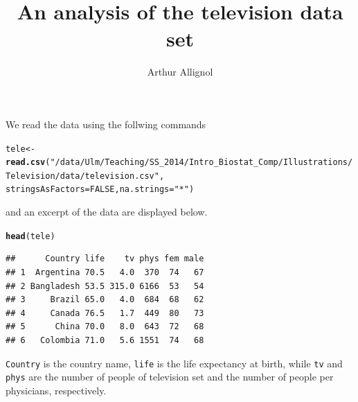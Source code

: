 \documentclass{article}\usepackage[]{graphicx}\usepackage[]{color}
\title{An analysis of the television data set}
\author{Arthur Allignol}
\date{}
\makeatletter
\newcommand{\hlnum}[1]{\textcolor[rgb]{0.686,0.059,0.569}{#1}}%
\newcommand{\hlstr}[1]{\textcolor[rgb]{0.192,0.494,0.8}{#1}}%
\newcommand{\hlstd}[1]{\textcolor[rgb]{0.345,0.345,0.345}{#1}}%
\newcommand{\hlkwb}[1]{\textcolor[rgb]{0.69,0.353,0.396}{#1}}%
\newcommand{\hlkwc}[1]{\textcolor[rgb]{0.333,0.667,0.333}{#1}}%
\newcommand{\hlkwd}[1]{\textcolor[rgb]{0.737,0.353,0.396}{\textbf{#1}}}%
\newenvironment{kframe}{%
 \def\at@end@of@kframe{}%
 \ifinner\ifhmode%
  \def\at@end@of@kframe{\end{minipage}}%
  \begin{minipage}{\columnwidth}%
 \fi\fi%
 \def\FrameCommand##1{\hskip\@totalleftmargin \hskip-\fboxsep
 \colorbox{shadecolor}{##1}\hskip-\fboxsep
     \hskip-\linewidth \hskip-\@totalleftmargin \hskip\columnwidth}%
 \MakeFramed {\advance\hsize-\width
   \@totalleftmargin\z@ \linewidth\hsize
   \@setminipage}}%
 {\par\unskip\endMakeFramed%
 \at@end@of@kframe}
\newenvironment{knitrout}{}{} %
\makeatother
\begin{document}
\maketitle



We read the data using the follwing commands
\begin{knitrout}\scriptsize
{}\color{fgcolor}\begin{kframe}
\begin{alltt}
\hlstd{tele} \hlkwb{<-} \hlkwd{read.csv}\hlstd{(}\hlstr{"/data/Ulm/Teaching/SS_2014/Intro_Biostat_Comp/Illustrations/Television/data/television.csv"}\hlstd{,}
                 \hlkwc{stringsAsFactors} \hlstd{=} \hlnum{FALSE}\hlstd{,} \hlkwc{na.strings} \hlstd{=} \hlstr{"*"}\hlstd{)}
\end{alltt}
\end{kframe}
\end{knitrout}
and an excerpt of the data are displayed below.
\begin{knitrout}\scriptsize
{}\color{fgcolor}\begin{kframe}
\begin{alltt}
\hlkwd{head}\hlstd{(tele)}
\end{alltt}
\begin{verbatim}
##      Country life    tv phys fem male
## 1  Argentina 70.5   4.0  370  74   67
## 2 Bangladesh 53.5 315.0 6166  53   54
## 3     Brazil 65.0   4.0  684  68   62
## 4     Canada 76.5   1.7  449  80   73
## 5      China 70.0   8.0  643  72   68
## 6   Colombia 71.0   5.6 1551  74   68
\end{verbatim}
\end{kframe}
\end{knitrout}
\verb=Country= is the country name, \verb=life= is the life expectancy at birth, while \verb=tv= and \verb=phys= 
are the number of people of television set and the number of people per physicians, respectively.
\end{document}
